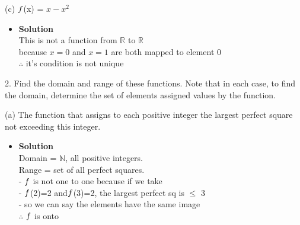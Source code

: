 \documentclass[11pt]{article}
\begin{document}
\begin{enumerate}

\begin{flushleft}
\end{flushleft}

\large (c) $\mathnormal{f}$(x) = $x-x^2$\\

\begin{itemize}
\item \textbf{Solution}\\
\large This is not a function from $\mathbb{ R}$ to $\mathbb{ R}$ \\
\large because $x=0$ and $x=1$ are both mapped to element 0 \\
\large $\therefore $ it's condition is not unique\\
\end {itemize}
\end {enumerate}



\pagebreak







\begin{enumerate}

\begin{flushleft}
{\large 2. Find the domain and range of these functions. Note that in each case, to find the domain, determine
the set of elements assigned values by the function.}\\
\end{flushleft}



\large (a) The function that assigns to each positive integer the largest perfect square not exceeding this
integer.\\

\begin{itemize}
\item \textbf{Solution}\\
\large Domain = $\mathbb{N}$, all positive integers.\\
\large Range = set of all perfect squares.\\
\large - $\mathnormal{f}$ is not one to one because
if we take \\
\large - $\mathnormal{f}$(2)=2 and$\mathnormal{f}$(3)=2,
 the largest perfect sq is $\leq$ 3\\
 \large - so we can say the elements have the same image\\
 \large $\therefore$ $\mathnormal{f}$ is onto\\

\end {itemize}
\end {enumerate}
\end{document}
